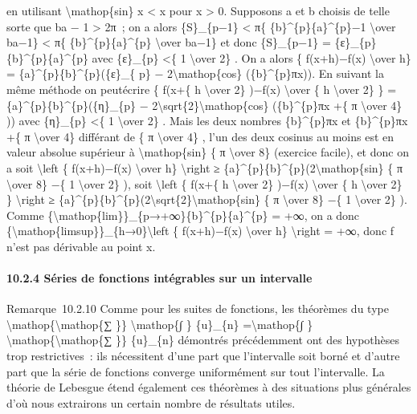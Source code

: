 \documentclass[]{article}
\begin{document}
en utilisant \textbar{}\textbackslash{}mathop\{sin\} x\textbar{}
\textless{} x pour x \textgreater{} 0. Supposons a et b choisis de telle
sorte que ba − 1 \textgreater{} 2π~; on a alors
\textbar{}\{S\}\_\{p−1\}\textbar{} \textless{} π\{
\{b\}\^{}\{p\}\{a\}\^{}\{p\}−1 \textbackslash{}over ba−1\} \textless{}
π\{ \{b\}\^{}\{p\}\{a\}\^{}\{p\} \textbackslash{}over ba−1\} et donc
\{S\}\_\{p−1\} = \{ε\}\_\{p\}\{b\}\^{}\{p\}\{a\}\^{}\{p\} avec
\textbar{}\{ε\}\_\{p\}\textbar{} \textless{}\{ 1 \textbackslash{}over
2\} . On a alors \{ f(x+h)−f(x) \textbackslash{}over h\} =
\{a\}\^{}\{p\}\{b\}\^{}\{p\}(\{ε\}\_\{ p\} −
2\textbackslash{}mathop\{cos\} (\{b\}\^{}\{p\}πx)). En suivant la même
méthode on peutécrire \{ f(x+\{ h \textbackslash{}over 2\} )−f(x)
\textbackslash{}over \{ h \textbackslash{}over 2\} \} =
\{a\}\^{}\{p\}\{b\}\^{}\{p\}(\{η\}\_\{p\} −
2\textbackslash{}sqrt\{2\}\textbackslash{}mathop\{cos\}
(\{b\}\^{}\{p\}πx +\{ π \textbackslash{}over 4\} )) avec
\textbar{}\{η\}\_\{p\}\textbar{} \textless{}\{ 1 \textbackslash{}over
2\} . Mais les deux nombres \{b\}\^{}\{p\}πx et \{b\}\^{}\{p\}πx +\{ π
\textbackslash{}over 4\} différant de \{ π \textbackslash{}over 4\} ,
l'un des deux cosinus au moins est en valeur absolue supérieur à
\textbackslash{}mathop\{sin\} \{ π \textbackslash{}over 8\} (exercice
facile), et donc on a soit \textbackslash{}left \textbar{}\{ f(x+h)−f(x)
\textbackslash{}over h\} \textbackslash{}right \textbar{}≥
\{a\}\^{}\{p\}\{b\}\^{}\{p\}(2\textbackslash{}mathop\{sin\} \{ π
\textbackslash{}over 8\} −\{ 1 \textbackslash{}over 2\} ), soit
\textbackslash{}left \textbar{}\{ f(x+\{ h \textbackslash{}over 2\}
)−f(x) \textbackslash{}over \{ h \textbackslash{}over 2\} \}
\textbackslash{}right \textbar{}≥
\{a\}\^{}\{p\}\{b\}\^{}\{p\}(2\textbackslash{}sqrt\{2\}\textbackslash{}mathop\{sin\}
\{ π \textbackslash{}over 8\} −\{ 1 \textbackslash{}over 2\} ). Comme
\{\textbackslash{}mathop\{lim\}\}\_\{p→+∞\}\{b\}\^{}\{p\}\{a\}\^{}\{p\}
= +∞, on a donc
\{\textbackslash{}mathop\{limsup\}\}\_\{h→0\}\textbackslash{}left
\textbar{}\{ f(x+h)−f(x) \textbackslash{}over h\} \textbackslash{}right
\textbar{} = +∞, donc f n'est pas dérivable au point x.

\paragraph{10.2.4 Séries de fonctions intégrables sur un intervalle}

Remarque~10.2.10 Comme pour les suites de fonctions, les théorèmes du
type \textbackslash{}mathop\{\textbackslash{}mathop\{∑ \}\}
\textbackslash{}mathop\{∫ \} \{u\}\_\{n\} =\textbackslash{}mathop\{∫ \}
\textbackslash{}mathop\{\textbackslash{}mathop\{∑ \}\} \{u\}\_\{n\}
démontrés précédemment ont des hypothèses trop restrictives~: ils
nécessitent d'une part que l'intervalle soit borné et d'autre part que
la série de fonctions converge uniformément sur tout l'intervalle. La
théorie de Lebesgue étend également ces théorèmes à des situations plus
générales d'où nous extrairons un certain nombre de résultats utiles.
\end{document}
